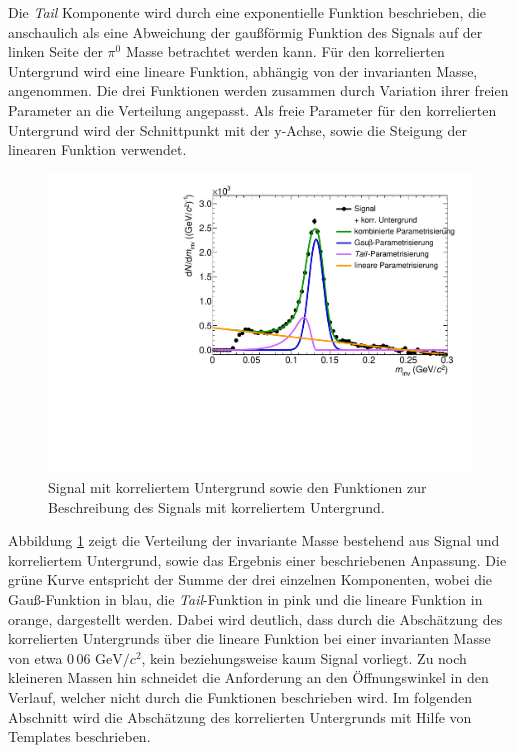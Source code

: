 Die \textit{Tail} Komponente wird durch eine exponentielle Funktion beschrieben, die anschaulich als eine Abweichung der gaußförmig Funktion des Signals auf der linken Seite der $\pi^{0}$ Masse betrachtet werden kann.
\newline
Für den korrelierten Untergrund wird eine lineare Funktion, abhängig von der invarianten Masse, angenommen.
\newline
Die drei Funktionen werden zusammen durch Variation ihrer freien Parameter an die Verteilung angepasst.
Als freie Parameter für den korrelierten Untergrund wird der Schnittpunkt mit der y-Achse, sowie die Steigung der linearen Funktion verwendet.
\begin{figure}[tp]
\centering
\includegraphics[width=.75\linewidth]{StandardParam.pdf}
\caption{Signal mit korreliertem Untergrund sowie den Funktionen zur Beschreibung des Signals mit korreliertem Untergrund.}
\label{figStandardParam}
\end{figure}
\newline
Abbildung \ref{figStandardParam} zeigt die Verteilung der invariante Masse bestehend aus Signal und korreliertem Untergrund, sowie das Ergebnis einer beschriebenen Anpassung.
Die grüne Kurve entspricht der Summe der drei einzelnen Komponenten, wobei die Gauß-Funktion in blau, die \textit{Tail}-Funktion in pink und die lineare Funktion in orange, dargestellt werden.
Dabei wird deutlich, dass durch die Abschätzung des korrelierten Untergrunds über die lineare Funktion bei einer invarianten Masse von etwa $0\,06\text{ GeV}/c^{2}$, kein beziehungsweise kaum Signal vorliegt.
Zu noch kleineren Massen hin schneidet die Anforderung an den Öffnungswinkel in den Verlauf, welcher nicht durch die Funktionen beschrieben wird.
\newline
Im folgenden Abschnitt wird die Abschätzung des korrelierten Untergrunds mit Hilfe von Templates beschrieben.
